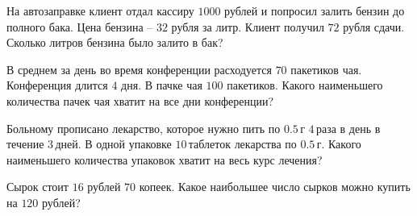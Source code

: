 \begin{homework}[number=1]
\begin{listofex}
	\item На автозаправке клиент отдал кассиру \( 1000 \) рублей и попросил залить бензин до полного бака. Цена бензина -- \( 32 \) рубля за литр. Клиент получил \( 72 \) рубля сдачи. Сколько литров бензина было залито в бак?
	\item В среднем за день во время конференции расходуется \( 70 \) пакетиков чая. Конференция длится \(  4 \) дня. В пачке чая \( 100 \) пакетиков. Какого наименьшего количества пачек чая хватит на все дни конференции?
	\item Больному прописано лекарство, которое нужно пить по \( 0.5 \) г \( 4 \) раза в день в течение \( 3 \) дней. В одной упаковке \( 10 \) таблеток лекарства по \( 0.5 \) г. Какого наименьшего количества упаковок хватит на весь курс лечения?
	\item Сырок стоит \( 16 \) рублей \( 70 \) копеек. Какое наибольшее число сырков можно купить на \( 120 \) рублей?
	\end{listofex}
\end{homework}
%
%
%
%		
%
%
%	
%
%
%	
%
%
%	
%
%
%

